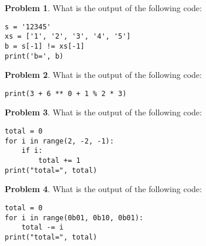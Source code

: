 \documentclass[10pt]{article}
\theoremstyle{definition}
\newtheorem{problem}{Problem}
\begin{document}
\begin{problem}
    What is the output of the following code:
\end{problem}
\begin{lstlisting}
s = '12345'
xs = ['1', '2', '3', '4', '5']
b = s[-1] != xs[-1]
print('b=', b)
\end{lstlisting}
\vspace{1.5in}

\newpage
\begin{problem}
    What is the output of the following code:
\end{problem}
\begin{lstlisting}
print(3 + 6 ** 0 + 1 % 2 * 3)
\end{lstlisting}
\vspace{1.5in}


\begin{problem}
    What is the output of the following code:
\end{problem}
\begin{lstlisting}
total = 0
for i in range(2, -2, -1):
    if i:
        total += 1
print("total=", total)
\end{lstlisting}
\vspace{1.5in}


\begin{problem}
    What is the output of the following code:
\end{problem}
\begin{lstlisting}
total = 0
for i in range(0b01, 0b10, 0b01):
    total -= i
print("total=", total)
\end{lstlisting}
\vspace{1.5in}
\end{document}
